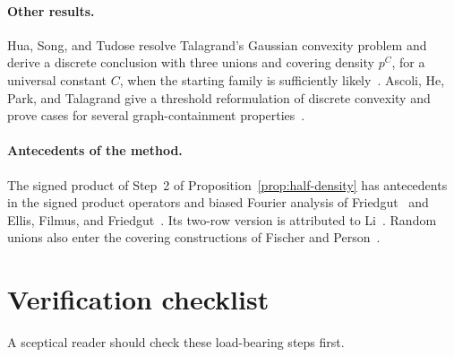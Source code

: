 \documentclass[11pt,letterpaper]{article}
\theoremstyle{definition}
\theoremstyle{remark}
\numberwithin{equation}{section}
\begin{document}
\paragraph{Other results.}
Hua, Song, and Tudose resolve Talagrand's Gaussian convexity problem and
derive a discrete conclusion with three unions and covering density
$p^C$, for a universal constant $C$, when the starting family is
sufficiently likely~\cite[Corollaries~1.3--1.4]{HuaSongTudose26}.
Ascoli, He, Park, and Talagrand give a threshold reformulation of discrete
convexity and prove cases for several graph-containment
properties~\cite[Proposition~1.5 and Theorems~1.10--1.13]{AscoliEtAl26}.

\paragraph{Antecedents of the method.}
The signed product of Step~2 of Proposition~\ref{prop:half-density} has
antecedents in the signed product operators and biased Fourier analysis of
Friedgut~\cite[Section~2.2]{Friedgut08} and Ellis, Filmus, and
Friedgut~\cite[Sections~2.2 and~4.1]{EllisFilmusFriedgut12}. Its two-row
version is attributed to Li~\cite[Section~2]{Li26}. Random unions also
enter the covering constructions of Fischer and
Person~\cite[Sections~1.1 and~2]{FischerPerson25}.

\section{Verification checklist}
\label{sec:checklist}

A sceptical reader should check these load-bearing steps first.
\end{document}
